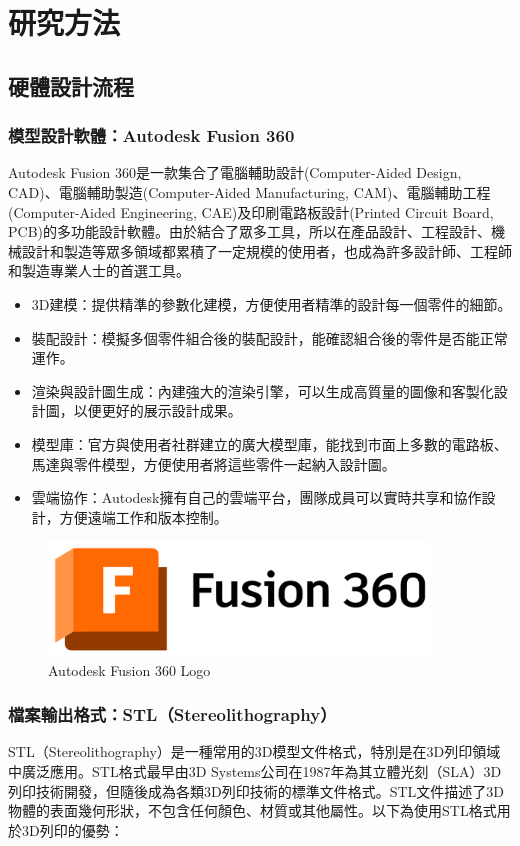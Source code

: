 \documentclass[class=NCU_thesis, crop=false]{standalone}
\begin{document}
\chapter{研究方法}
\section{硬體設計流程}
\subsection{模型設計軟體：Autodesk Fusion 360}
Autodesk Fusion 360是一款集合了電腦輔助設計(Computer-Aided Design, CAD)、電腦輔助製造(Computer-Aided Manufacturing, CAM)、電腦輔助工程(Computer-Aided Engineering, CAE)及印刷電路板設計(Printed Circuit Board, PCB)的多功能設計軟體。由於結合了眾多工具，所以在產品設計、工程設計、機械設計和製造等眾多領域都累積了一定規模的使用者，也成為許多設計師、工程師和製造專業人士的首選工具。

\begin{itemize}
    \item 3D建模：提供精準的參數化建模，方便使用者精準的設計每一個零件的細節。
    \item 裝配設計：模擬多個零件組合後的裝配設計，能確認組合後的零件是否能正常運作。
    \item 渲染與設計圖生成：內建強大的渲染引擎，可以生成高質量的圖像和客製化設計圖，以便更好的展示設計成果。
    \item 模型庫：官方與使用者社群建立的廣大模型庫，能找到市面上多數的電路板、馬達與零件模型，方便使用者將這些零件一起納入設計圖。
    \item 雲端協作：Autodesk擁有自己的雲端平台，團隊成員可以實時共享和協作設計，方便遠端工作和版本控制。
\end{itemize}

\begin{figure}[htbp]
    \centering
    \includegraphics[width=0.9\textwidth]{figures/autodesk-fusion-360-seeklogo.png}
\caption{Autodesk Fusion 360 Logo}
\end{figure}

\subsection{檔案輸出格式：STL（Stereolithography）}
STL（Stereolithography）是一種常用的3D模型文件格式，特別是在3D列印領域中廣泛應用。STL格式最早由3D Systems公司在1987年為其立體光刻（SLA）3D列印技術開發，但隨後成為各類3D列印技術的標準文件格式。STL文件描述了3D物體的表面幾何形狀，不包含任何顏色、材質或其他屬性。以下為使用STL格式用於3D列印的優勢：
\end{document}

